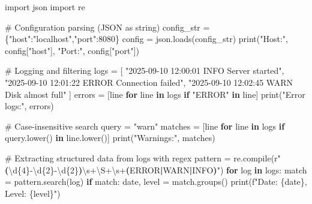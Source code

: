\documentclass[
  letterpaper,
  DIV=11,
  numbers=noendperiod]{scrreprt}
\newenvironment{Shaded}{\begin{snugshade}}{\end{snugshade}}
\newcommand{\BuiltInTok}[1]{\textcolor[rgb]{0.00,0.23,0.31}{#1}}
\newcommand{\CommentTok}[1]{\textcolor[rgb]{0.37,0.37,0.37}{#1}}
\newcommand{\ControlFlowTok}[1]{\textcolor[rgb]{0.00,0.23,0.31}{\textbf{#1}}}
\newcommand{\DecValTok}[1]{\textcolor[rgb]{0.68,0.00,0.00}{#1}}
\newcommand{\ImportTok}[1]{\textcolor[rgb]{0.00,0.46,0.62}{#1}}
\newcommand{\KeywordTok}[1]{\textcolor[rgb]{0.00,0.23,0.31}{\textbf{#1}}}
\newcommand{\NormalTok}[1]{\textcolor[rgb]{0.00,0.23,0.31}{#1}}
\newcommand{\OperatorTok}[1]{\textcolor[rgb]{0.37,0.37,0.37}{#1}}
\newcommand{\SpecialCharTok}[1]{\textcolor[rgb]{0.37,0.37,0.37}{#1}}
\newcommand{\SpecialStringTok}[1]{\textcolor[rgb]{0.13,0.47,0.30}{#1}}
\newcommand{\StringTok}[1]{\textcolor[rgb]{0.13,0.47,0.30}{#1}}
\newcommand{\VerbatimStringTok}[1]{\textcolor[rgb]{0.13,0.47,0.30}{#1}}
\begin{document}
\begin{Shaded}
\begin{Highlighting}[]
\ImportTok{import}\NormalTok{ json}
\ImportTok{import}\NormalTok{ re}

\CommentTok{\# Configuration parsing (JSON as string)}
\NormalTok{config\_str }\OperatorTok{=} \StringTok{\textquotesingle{}\{"host":"localhost","port":8080\}\textquotesingle{}}
\NormalTok{config }\OperatorTok{=}\NormalTok{ json.loads(config\_str)}
\BuiltInTok{print}\NormalTok{(}\StringTok{"Host:"}\NormalTok{, config[}\StringTok{"host"}\NormalTok{], }\StringTok{"Port:"}\NormalTok{, config[}\StringTok{"port"}\NormalTok{])}

\CommentTok{\# Logging and filtering}
\NormalTok{logs }\OperatorTok{=}\NormalTok{ [}
    \StringTok{"2025{-}09{-}10 12:00:01 INFO  Server started"}\NormalTok{,}
    \StringTok{"2025{-}09{-}10 12:01:22 ERROR Connection failed"}\NormalTok{,}
    \StringTok{"2025{-}09{-}10 12:02:45 WARN  Disk almost full"}
\NormalTok{]}
\NormalTok{errors }\OperatorTok{=}\NormalTok{ [line }\ControlFlowTok{for}\NormalTok{ line }\KeywordTok{in}\NormalTok{ logs }\ControlFlowTok{if} \StringTok{"ERROR"} \KeywordTok{in}\NormalTok{ line]}
\BuiltInTok{print}\NormalTok{(}\StringTok{"Error logs:"}\NormalTok{, errors)}

\CommentTok{\# Case{-}insensitive search}
\NormalTok{query }\OperatorTok{=} \StringTok{"warn"}
\NormalTok{matches }\OperatorTok{=}\NormalTok{ [line }\ControlFlowTok{for}\NormalTok{ line }\KeywordTok{in}\NormalTok{ logs }\ControlFlowTok{if}\NormalTok{ query.lower() }\KeywordTok{in}\NormalTok{ line.lower()]}
\BuiltInTok{print}\NormalTok{(}\StringTok{"Warnings:"}\NormalTok{, matches)}

\CommentTok{\# Extracting structured data from logs with regex}
\NormalTok{pattern }\OperatorTok{=}\NormalTok{ re.}\BuiltInTok{compile}\NormalTok{(}\VerbatimStringTok{r"}\KeywordTok{(}\DecValTok{\textbackslash{}d}\OperatorTok{\{4\}}\VerbatimStringTok{{-}}\DecValTok{\textbackslash{}d}\OperatorTok{\{2\}}\VerbatimStringTok{{-}}\DecValTok{\textbackslash{}d}\OperatorTok{\{2\}}\KeywordTok{)}\DecValTok{\textbackslash{}s}\OperatorTok{+}\DecValTok{\textbackslash{}S}\OperatorTok{+}\DecValTok{\textbackslash{}s}\OperatorTok{+}\KeywordTok{(}\VerbatimStringTok{ERROR}\ControlFlowTok{|}\VerbatimStringTok{WARN}\ControlFlowTok{|}\VerbatimStringTok{INFO}\KeywordTok{)}\VerbatimStringTok{"}\NormalTok{)}
\ControlFlowTok{for}\NormalTok{ log }\KeywordTok{in}\NormalTok{ logs:}
\NormalTok{    match }\OperatorTok{=}\NormalTok{ pattern.search(log)}
    \ControlFlowTok{if}\NormalTok{ match:}
\NormalTok{        date, level }\OperatorTok{=}\NormalTok{ match.groups()}
        \BuiltInTok{print}\NormalTok{(}\SpecialStringTok{f"Date: }\SpecialCharTok{\{}\NormalTok{date}\SpecialCharTok{\}}\SpecialStringTok{, Level: }\SpecialCharTok{\{}\NormalTok{level}\SpecialCharTok{\}}\SpecialStringTok{"}\NormalTok{)}
\end{Highlighting}
\end{Shaded}
\end{document}
